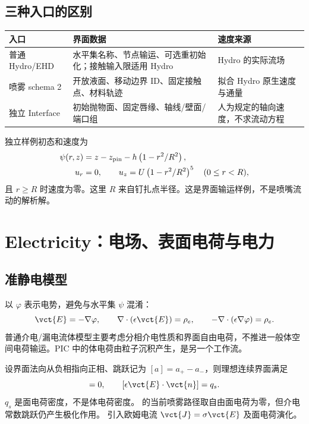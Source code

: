 \documentclass[a4paper,11pt]{article}
\begin{document}
\subsection{三种入口的区别}
\begin{longtable}{L{.23\linewidth}L{.33\linewidth}L{.36\linewidth}}
\toprule 入口 & 界面数据 & 速度来源 \\\midrule\endhead
普通 Hydro/EHD & 水平集名称、节点输运、可选重初始化；接触输入限适用 Hydro & Hydro 的实际流场 \\
喷雾 schema 2 & 开放液面、移动边界 ID、固定接触点、材料轨迹 & 拟合 Hydro 原生速度与通量 \\
独立 Interface & 初始抛物面、固定唇缘、轴线/壁面/端口组 & 人为规定的轴向速度，不求流动方程 \\
\bottomrule
\end{longtable}
独立样例初态和速度为
\begin{align}
\psi(r,z)&=z-z_{\rm pin}-h\left(1-r^2/R^2\right),\\
u_r&=0,\qquad u_z=U\left(1-r^2/R^2\right)^5\quad(0\le r<R),
\end{align}
且 $r\ge R$ 时速度为零。这里 $R$ 来自钉扎点半径。这是界面输运样例，不是喷嘴流动的解析解。

\section{Electricity：电场、表面电荷与电力}
\subsection{准静电模型}
以 $\varphi$ 表示电势，避免与水平集 $\psi$ 混淆：
\begin{equation}
\vct{E}=-\nabla\varphi,\qquad
\nabla\cdot(\epsilon\vct{E})=\rho_e,\qquad
-\nabla\cdot(\epsilon\nabla\varphi)=\rho_e.
\end{equation}
普通介电/漏电流体模型主要考虑分相介电性质和界面自由电荷，不推进一般体空间电荷输运。PIC 中的体电荷由粒子沉积产生，是另一个工作流。

设界面法向从负相指向正相、跳跃记为 $[a]=a_+-a_-$，则理想连续界面满足
\begin{equation}
[\varphi]=0,\qquad [\epsilon\vct{E}\cdot\vct{n}]=q_s.
\end{equation}
$q_s$ 是面电荷密度，不是体电荷密度。 的当前喷雾路径取自由面电荷为零，但介电常数跳跃仍产生极化作用。 引入欧姆电流 $\vct{J}=\sigma\vct{E}$ 及面电荷演化。
\end{document}
